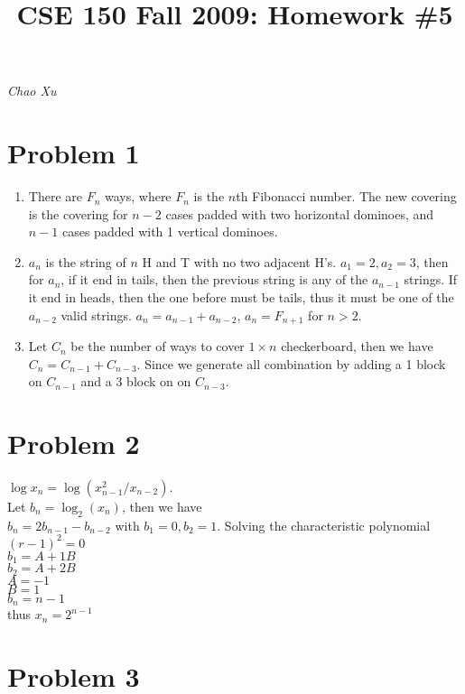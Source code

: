 \documentclass[letter]{article}
\title{CSE 150 Fall 2009: Homework \#5}
\date{}
\begin{document}
\maketitle
\vspace{-.5in}
\emph{Chao Xu}

\section*{Problem 1}

\begin{enumerate}
\item There are $F_n$ ways, where $F_n$ is the $n$th Fibonacci number. The new covering is the covering for $n-2$  cases padded with two horizontal dominoes, and $n-1$ cases padded with 1 vertical dominoes. 

  \item 
$a_n$ is the string of $n$ H and T with no two adjacent H's. $a_1 = 2,a_2=3$, then for $a_n$, if it end in tails, then the previous string is any of the $a_{n-1}$ strings. If it end in heads, then the one before must be tails, thus it must be one of the $a_{n-2}$ valid strings. $a_n = a_{n-1} + a_{n-2}$, $a_n = F_{n+1}$ for $n>2$.
  \item 
Let $C_n$ be the number of ways to cover $1\times n$ checkerboard, then we have $C_n = C_{n-1} + C_{n-3}$. Since we generate all combination by adding a 1 block on $C_{n-1}$ and a 3 block on on $C_{n-3}$.
\end{enumerate}

\section*{Problem 2}

$\log x_n=\log(x_{n-1}^2/x_{n-2})$.\\
Let $b_n = \log_2(x_n)$, then we have\\
$b_n = 2b_{n-1} - b_{n-2}$ with $b_1 = 0, b_2 = 1$.
Solving the characteristic polynomial
$(r-1)^2 = 0$\\
$b_1 = A + 1B$\\
$b_2 = A + 2B$\\
$A = -1$\\
$B = 1$\\
$b_n =n-1$\\
thus $x_n = 2^{n-1}$

\section*{Problem 3}
\end{document}
